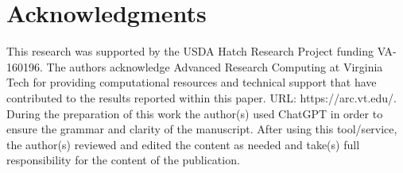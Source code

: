 \documentclass[journal,twoside,web]{ieeecolor}
\begin{document}
\section*{Acknowledgments}

This research was supported by the USDA Hatch Research Project funding VA-160196. The authors acknowledge Advanced Research Computing at Virginia Tech for providing computational resources and technical support that have contributed to the results reported within this paper. URL: https://arc.vt.edu/. During the preparation of this work the author(s) used ChatGPT in order to ensure the grammar and clarity of the manuscript. After using this tool/service, the author(s) reviewed and edited the content as needed and take(s) full responsibility for the content of the publication.


\newpage





\end{document}
